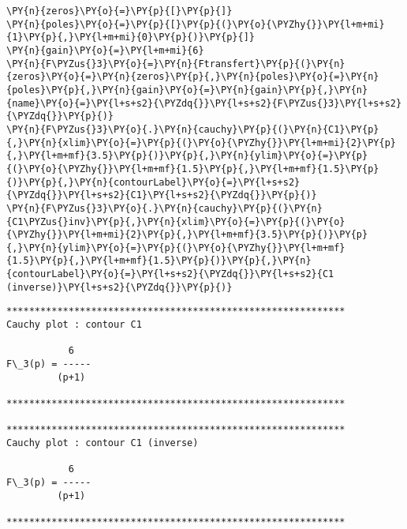     \begin{tcolorbox}[breakable, size=fbox, boxrule=1pt, pad at break*=1mm,colback=cellbackground, colframe=cellborder]
\begin{Verbatim}[commandchars=\\\{\}]
\PY{n}{zeros}\PY{o}{=}\PY{p}{[}\PY{p}{]}
\PY{n}{poles}\PY{o}{=}\PY{p}{[}\PY{p}{(}\PY{o}{\PYZhy{}}\PY{l+m+mi}{1}\PY{p}{,}\PY{l+m+mi}{0}\PY{p}{)}\PY{p}{]}
\PY{n}{gain}\PY{o}{=}\PY{l+m+mi}{6}
\PY{n}{F\PYZus{}3}\PY{o}{=}\PY{n}{Ftransfert}\PY{p}{(}\PY{n}{zeros}\PY{o}{=}\PY{n}{zeros}\PY{p}{,}\PY{n}{poles}\PY{o}{=}\PY{n}{poles}\PY{p}{,}\PY{n}{gain}\PY{o}{=}\PY{n}{gain}\PY{p}{,}\PY{n}{name}\PY{o}{=}\PY{l+s+s2}{\PYZdq{}}\PY{l+s+s2}{F\PYZus{}3}\PY{l+s+s2}{\PYZdq{}}\PY{p}{)}
\PY{n}{F\PYZus{}3}\PY{o}{.}\PY{n}{cauchy}\PY{p}{(}\PY{n}{C1}\PY{p}{,}\PY{n}{xlim}\PY{o}{=}\PY{p}{(}\PY{o}{\PYZhy{}}\PY{l+m+mi}{2}\PY{p}{,}\PY{l+m+mf}{3.5}\PY{p}{)}\PY{p}{,}\PY{n}{ylim}\PY{o}{=}\PY{p}{(}\PY{o}{\PYZhy{}}\PY{l+m+mf}{1.5}\PY{p}{,}\PY{l+m+mf}{1.5}\PY{p}{)}\PY{p}{,}\PY{n}{contourLabel}\PY{o}{=}\PY{l+s+s2}{\PYZdq{}}\PY{l+s+s2}{C1}\PY{l+s+s2}{\PYZdq{}}\PY{p}{)}
\PY{n}{F\PYZus{}3}\PY{o}{.}\PY{n}{cauchy}\PY{p}{(}\PY{n}{C1\PYZus{}inv}\PY{p}{,}\PY{n}{xlim}\PY{o}{=}\PY{p}{(}\PY{o}{\PYZhy{}}\PY{l+m+mi}{2}\PY{p}{,}\PY{l+m+mf}{3.5}\PY{p}{)}\PY{p}{,}\PY{n}{ylim}\PY{o}{=}\PY{p}{(}\PY{o}{\PYZhy{}}\PY{l+m+mf}{1.5}\PY{p}{,}\PY{l+m+mf}{1.5}\PY{p}{)}\PY{p}{,}\PY{n}{contourLabel}\PY{o}{=}\PY{l+s+s2}{\PYZdq{}}\PY{l+s+s2}{C1 (inverse)}\PY{l+s+s2}{\PYZdq{}}\PY{p}{)}
\end{Verbatim}
\end{tcolorbox}

    \begin{Verbatim}[commandchars=\\\{\}]
************************************************************
Cauchy plot : contour C1

           6
F\_3(p) = -----
         (p+1)

************************************************************

************************************************************
Cauchy plot : contour C1 (inverse)

           6
F\_3(p) = -----
         (p+1)

************************************************************

    \end{Verbatim}

    \begin{center}
    \end{center}
    { \hspace*{\fill} \\}
    
